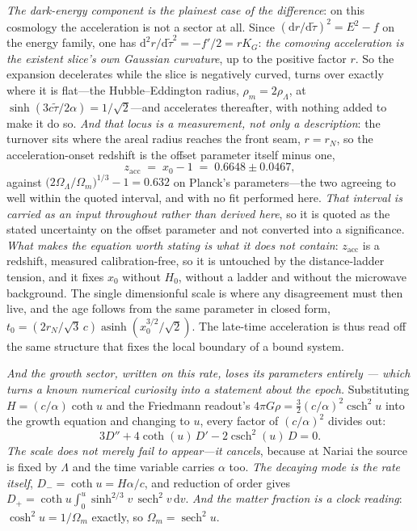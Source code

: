 \documentclass[11pt,a4paper]{article}
\theoremstyle{plain}
\theoremstyle{definition}
\theoremstyle{remark}
\newcommand{\dd}{\mathrm{d}}   %
\begin{document}
\emph{The dark-energy component is the plainest case of the difference}: on this cosmology the acceleration is not a sector at all. Since $(\mathrm{d}r/\mathrm{d}\tilde\tau)^{2}=E^{2}-f$ on the energy family, one has $\mathrm{d}^{2}r/\mathrm{d}\tilde\tau^{2}=-f'/2=rK_{G}$: \emph{the comoving acceleration is the existent slice's own Gaussian curvature}, up to the positive factor $r$. So the expansion decelerates while the slice is negatively curved, turns over exactly where it is flat---the Hubble--Eddington radius, $\rho_{m}=2\rho_{\Lambda}$, at $\sinh(3c\tilde\tau/2\alpha)=1/\sqrt2$---and accelerates thereafter, with nothing added to make it do so.  \emph{And that locus is a
measurement, not only a description}: the turnover sits where the areal radius reaches the front seam,
$r=r_{N}$, so the acceleration-onset redshift is the offset parameter itself minus one,
\begin{equation}\label{eq:zacc}
z_{\mathrm{acc}} \;=\; x_{0}-1 \;=\; 0.6648 \pm 0.0467 ,
\end{equation}
against $\bigl(2\Omega_\Lambda/\Omega_m\bigr)^{1/3}-1=0.632$ on Planck's parameters---the two agreeing to
well within the quoted interval, and with no fit performed here. \emph{That interval is carried as an input
throughout rather than derived here}, so it is quoted as the stated uncertainty on the offset parameter and
not converted into a significance.  \emph{What makes the equation worth stating is what it does
not contain}: $z_{\mathrm{acc}}$ is a redshift, measured calibration-free, so it is untouched by the
distance-ladder tension, and it fixes $x_{0}$ without $H_{0}$, without a ladder and without the microwave
background.  The single dimensionful scale is where any disagreement must then live, and the age follows
from the same parameter in closed form, $t_{0}=(2r_{N}/\sqrt3\,c)\operatorname{asinh}(x_{0}^{3/2}/\sqrt2)$. The late-time acceleration is thus read off the same structure that fixes the local boundary of a bound system.

\emph{And the growth sector, written on this rate, loses its parameters entirely --- which turns a known
numerical curiosity into a statement about the epoch.} Substituting $H=(c/\alpha)\coth u$ and the Friedmann
readout's $4\pi G\rho=\tfrac32(c/\alpha)^{2}\operatorname{csch}^{2}u$ into the growth equation and changing to
$u$, every factor of $(c/\alpha)^{2}$ divides out:
\begin{equation}\label{eq:growth-native}
3D''+4\coth(u)\,D'-2\operatorname{csch}^{2}(u)\,D=0 .
\end{equation}
\emph{The scale does not merely fail to appear---it cancels}, because at Nariai the source is fixed by
$\Lambda$ and the time variable carries $\alpha$ too. \emph{The decaying mode is the rate itself},
$D_{-}=\coth u=H\alpha/c$, and reduction of order gives
$D_{+}=\coth u\int_{0}^{u}\sinh^{2/3}v\,\operatorname{sech}^{2}v\,\dd v$. \emph{And the matter fraction is a
clock reading}: $\cosh^{2}u=1/\Omega_m$ exactly, so $\Omega_m=\operatorname{sech}^{2}u$.
\end{document}
